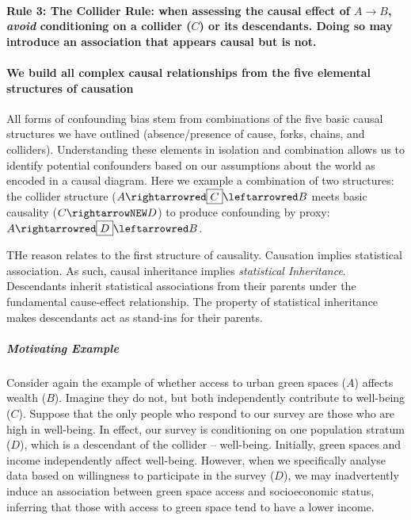 \documentclass[
  singlecolumn]{article}
\let\oldparagraph\paragraph
\renewcommand{\paragraph}[1]{\oldparagraph{#1}\mbox{}}
\let\oldsubparagraph\subparagraph
\renewcommand{\subparagraph}[1]{\oldsubparagraph{#1}\mbox{}}
\begin{document}
\paragraph{\texorpdfstring{\textbf{Rule 3: The Collider Rule:} when
assessing the causal effect of \(A\to B\), \emph{avoid} conditioning on
a collider (\(C\)) or its descendants. Doing so may introduce an
association that appears causal but is
not.}{Rule 3: The Collider Rule: when assessing the causal effect of A\textbackslash to B, avoid conditioning on a collider (C) or its descendants. Doing so may introduce an association that appears causal but is not.}}\label{rule-3-the-collider-rule-when-assessing-the-causal-effect-of-ato-b-avoid-conditioning-on-a-collider-c-or-its-descendants.-doing-so-may-introduce-an-association-that-appears-causal-but-is-not.}

\paragraph{We build all complex causal relationships from the five
elemental structures of
causation}\label{we-build-all-complex-causal-relationships-from-the-five-elemental-structures-of-causation}

All forms of confounding bias stem from combinations of the five basic
causal structures we have outlined (absence/presence of cause, forks,
chains, and colliders). Understanding these elements in isolation and
combination allows us to identify potential confounders based on our
assumptions about the world as encoded in a causal diagram. Here we
example a combination of two structures: the collider structure
(\(A \rightarrowred \boxed{C} \leftarrowred B\) meets basic causality
(\(C\rightarrowNEW D\)) to produce confounding by proxy:
\(A \rightarrowred \boxed{D} \leftarrowred B\).

THe reason relates to the first structure of causality. Causation
implies statistical association. As such, causal inheritance implies
\emph{statistical Inheritance}. Descendants inherit statistical
associations from their parents under the fundamental cause-effect
relationship. The property of statistical inheritance makes descendants
act as stand-ins for their parents.

\subparagraph{Motivating Example}\label{motivating-example-3}

Consider again the example of whether access to urban green spaces
(\(A\)) affects wealth (\(B\)). Imagine they do not, but both
independently contribute to well-being (\(C\)). Suppose that the only
people who respond to our survey are those who are high in well-being.
In effect, our survey is conditioning on one population stratum (\(D\)),
which is a descendant of the collider -- well-being. Initially, green
spaces and income independently affect well-being. However, when we
specifically analyse data based on willingness to participate in the
survey (\(\boxed{D}\)), we may inadvertently induce an association
between green space access and socioeconomic status, inferring that
those with access to green space tend to have a lower income.
\end{document}
